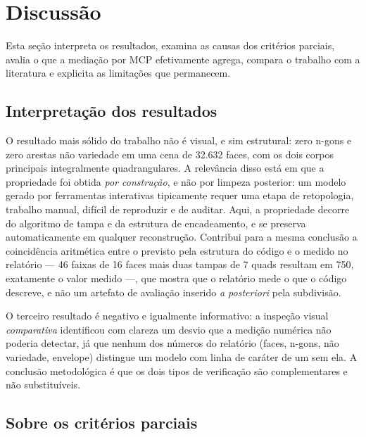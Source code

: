 \section{Discuss\~ao}
\label{sec:discussao}

Esta se\c{c}\~ao interpreta os resultados, examina as causas dos crit\'erios parciais,
avalia o que a media\c{c}\~ao por MCP efetivamente agrega, compara o trabalho com a
literatura e explicita as limita\c{c}\~oes que permanecem.

\subsection{Interpreta\c{c}\~ao dos resultados}

O resultado mais s\'olido do trabalho n\~ao \'e visual, e sim estrutural: zero n-gons e
zero arestas n\~ao variedade em uma cena de 32.632 faces, com os dois corpos principais
integralmente quadrangulares. A relev\^ancia disso est\'a em que a propriedade foi obtida
\emph{por constru\c{c}\~ao}, e n\~ao por limpeza posterior: um modelo gerado por
ferramentas interativas tipicamente requer uma etapa de retopologia, trabalho manual,
dif\'icil de reproduzir e de auditar. Aqui, a propriedade decorre do algoritmo de tampa e
da estrutura de encadeamento, e se preserva automaticamente em qualquer
reconstru\c{c}\~ao. Contribui para a mesma conclus\~ao a coincid\^encia aritm\'etica entre
o previsto pela estrutura do c\'odigo e o medido no relat\'orio --- 46 faixas de 16 faces
mais duas tampas de 7 quads resultam em 750, exatamente o valor medido ---, que mostra que
o relat\'orio mede o que o c\'odigo descreve, e n\~ao um artefato de avalia\c{c}\~ao
inserido \emph{a posteriori} pela subdivis\~ao.

O terceiro resultado \'e negativo e igualmente informativo: a inspe\c{c}\~ao visual
\emph{comparativa} identificou com clareza um desvio que a medi\c{c}\~ao num\'erica
n\~ao poderia detectar, j\'a que nenhum dos n\'umeros do relat\'orio (faces, n-gons,
n\~ao variedade, envelope) distingue um modelo com linha de car\'ater de um sem ela. A
conclus\~ao metodol\'ogica \'e que os dois tipos de verifica\c{c}\~ao s\~ao complementares
e n\~ao substitu\'iveis.

\subsection{Sobre os crit\'erios parciais}

